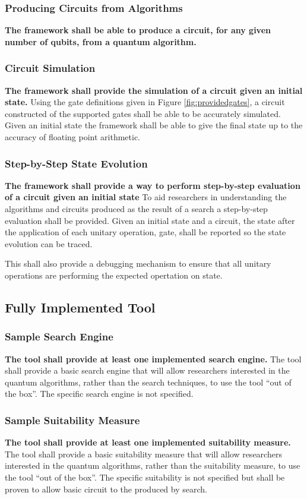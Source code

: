 \subsubsection{Producing Circuits from Algorithms}
\textbf{The framework shall be able to produce a circuit, for any given number of qubits, from a quantum algorithm.}

\subsubsection{Circuit Simulation}
\textbf{The framework shall provide the simulation of a circuit given an initial state.}
Using the gate definitions given in Figure \ref{fig:providedgates}, a circuit constructed of the supported gates shall be able to be accurately simulated.
Given an initial state the framework shall be able to give the final state up to the accuracy of floating point arithmetic.

\subsubsection{Step-by-Step State Evolution}
\textbf{The framework shall provide a way to perform step-by-step evaluation of a circuit given an initial state}
To aid researchers in understanding the algorithms and circuits produced as the result of a search a step-by-step evaluation shall be provided.
Given an initial state and a circuit, the state after the application of each unitary operation, gate, shall be reported so the state evolution can be traced.

This shall also provide a debugging mechanism to ensure that all unitary operations are performing the expected opertation on state.

\subsection{Fully Implemented Tool}
\subsubsection{Sample Search Engine}
\textbf{The tool shall provide at least one implemented search engine.}
The tool shall provide a basic search engine that will allow researchers interested in the quantum algorithms, rather than the search techniques, to use the tool ``out of the box''.
The specific search engine is not specified.

\subsubsection{Sample Suitability Measure}
\textbf{The tool shall provide at least one implemented suitability measure.}
The tool shall provide a basic suitability measure that will allow researchers interested in the quantum algorithms, rather than the suitability measure, to use the tool ``out of the box''.
The specific suitability is not specified but shall be proven to allow basic circuit to the produced by search.

